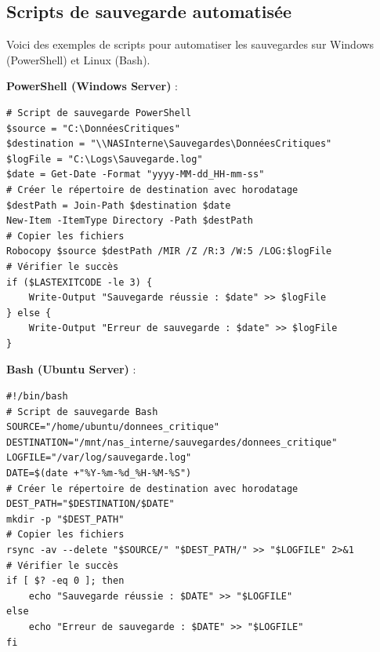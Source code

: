 \subsection*{Scripts de sauvegarde automatisée}
{}
\noindent Voici des exemples de scripts pour automatiser les sauvegardes sur Windows (PowerShell) et Linux (Bash).

\vspace{0.5cm}

\noindent \textbf{PowerShell (Windows Server)} :
\begin{verbatim}
# Script de sauvegarde PowerShell
$source = "C:\DonnéesCritiques"
$destination = "\\NASInterne\Sauvegardes\DonnéesCritiques"
$logFile = "C:\Logs\Sauvegarde.log"
$date = Get-Date -Format "yyyy-MM-dd_HH-mm-ss"
# Créer le répertoire de destination avec horodatage
$destPath = Join-Path $destination $date
New-Item -ItemType Directory -Path $destPath
# Copier les fichiers
Robocopy $source $destPath /MIR /Z /R:3 /W:5 /LOG:$logFile
# Vérifier le succès
if ($LASTEXITCODE -le 3) {
	Write-Output "Sauvegarde réussie : $date" >> $logFile
} else {
	Write-Output "Erreur de sauvegarde : $date" >> $logFile
}
\end{verbatim}

\vspace{0.5cm}

\noindent \textbf{Bash (Ubuntu Server)} :
\begin{verbatim}
#!/bin/bash
# Script de sauvegarde Bash
SOURCE="/home/ubuntu/donnees_critique"
DESTINATION="/mnt/nas_interne/sauvegardes/donnees_critique"
LOGFILE="/var/log/sauvegarde.log"
DATE=$(date +"%Y-%m-%d_%H-%M-%S")
# Créer le répertoire de destination avec horodatage
DEST_PATH="$DESTINATION/$DATE"
mkdir -p "$DEST_PATH"
# Copier les fichiers
rsync -av --delete "$SOURCE/" "$DEST_PATH/" >> "$LOGFILE" 2>&1
# Vérifier le succès
if [ $? -eq 0 ]; then
	echo "Sauvegarde réussie : $DATE" >> "$LOGFILE"
else
	echo "Erreur de sauvegarde : $DATE" >> "$LOGFILE"
fi
\end{verbatim}

